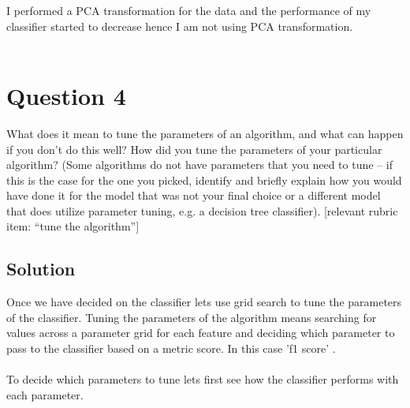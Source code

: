 \documentclass[12pt]{article}%
\begin{document}
\newpage
I performed a PCA transformation for the data and the performance of my classifier started to decrease hence I am not using PCA transformation.
\\
\\

\section*{Question 4}
What does it mean to tune the parameters of an algorithm, and what can happen if you don’t do this well?  How did you tune the parameters of your particular algorithm? (Some algorithms do not have parameters that you need to tune -- if this is the case for the one you picked, identify and briefly explain how you would have done it for the model that was not your final choice or a different model that does utilize parameter tuning, e.g. a decision tree classifier).  [relevant rubric item: “tune the algorithm”]

\subsection*{Solution}
Once we have decided on the classifier lets use grid search to tune the parameters of the classifier. Tuning the parameters of the algorithm means searching for values across a parameter grid for each feature and deciding which parameter to pass to the classifier based on a metric score. In this case 'f1 score' .
\\
\\
To decide which parameters to tune lets first see how the classifier performs with each parameter.
\end{document}
